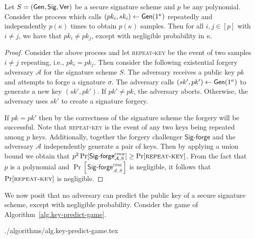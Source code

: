 \begin{lemma}\label{lem:distinct-keys}
  Let $S = (\mathsf{Gen}, \mathsf{Sig}, \mathsf{Ver})$ be a secure signature scheme and $p$ be any polynomial. Consider the process which calls $(pk_i, sk_i) \gets \mathsf{Gen}(1^\kappa)$ repeatedly and independently $p(\kappa)$ times to obtain $p(\kappa)$ samples. Then for all $i, j \in [p]$ with $i \neq j$, we have that $pk_i \neq pk_j$, except with negligible probability in $\kappa$.
\end{lemma}
\begin{proof}
  Consider the above process and let \textsc{repeat-key} be the event of two samples $i \neq j$ repeating, i.e., $pk_i = pk_j$. Then consider the following existential forgery adversary $\mathcal{A}$ for the signature scheme $S$. The adversary receives a public key $pk$ and attempts to forge a signature $\sigma$. The adversary calls $(sk', pk') \gets \mathsf{Gen}(1^\kappa)$ to generate a new key $(sk', pk')$. If $pk' \neq pk$, the adversary aborts. Otherwise, the adversary uses $sk'$ to create a signature forgery.

  If $pk = pk'$ then by the correctness of the signature scheme the forgery will be successful. Note that \textsc{repeat-key} is the event of any two keys being repeated among $p$ keys. Additionally, together the forgery challenger $\textsf{Sig-forge}$ and the adversary $\mathcal{A}$ independently generate a pair of keys. Then by applying a union bound we obtain that $p^2 \Pr[\textsf{Sig-forge}^{cma}_{\mathcal{A},S}] \geq \Pr[\textsc{repeat-key}]$. From the fact that $p$ is a polynomial and
  $\Pr[\textsf{Sig-forge}^{cma}_{\mathcal{A},S}]$ is negligible, it follows that $\Pr[\textsc{repeat-key}]$ is negligible.
\end{proof}

We now posit that no adversary can predict the public key of a secure signature scheme, except with negligible probability. Consider the game of Algorithm~\ref{alg.key-predict-game}.

{./algorithms/alg.key-predict-game.tex}

